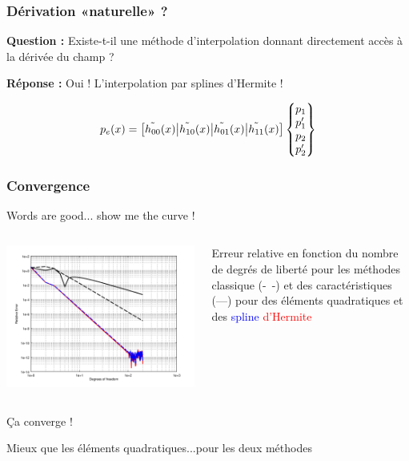 \documentclass[10pt, compress]{beamer}
\begin{document}
\begin{frame}
	\frametitle{Dérivation «naturelle» ?}

	\textbf{Question :} Existe-t-il une méthode d'interpolation donnant \alert{directement accès} à la dérivée du champ
	?

	\pause
	\bigskip

	\textbf{Réponse :} Oui ! L'interpolation par \alert{splines d'Hermite} !

	\begin{equation*}
		p_e(x) = \left[\tilde{h_{00}}(x)\big|\tilde{h_{10}}(x)\big|\tilde{h_{01}}(x)\big|\tilde{h_{11}}(x)\right]\begin{Bmatrix}p_1\\p'_1\\p_2\\p'_2\end{Bmatrix}
	\end{equation*}
\end{frame}

\begin{frame}
	\frametitle{Convergence}
	\begin{block}{Words are good... show me the curve !}
		\begin{columns}[onlytextwidth]
		\begin{column}{0.6\textwidth}
			\includegraphics[width=\textwidth]{../report/part4/figs/herm_comp.png}
		\end{column}
		\begin{column}{0.4\textwidth}
            \footnotesize{Erreur relative en fonction du nombre de degrés de liberté pour les méthodes classique
            (-~-) et des caractéristiques (---) pour des éléments quadratiques et des \textcolor{blue}{spline}
            \textcolor{red}{d'Hermite}}
		\end{column}
		\end{columns}
	\end{block}

    \pause

    \begin{center}
        \alert{Ça converge !}

        \pause

        Mieux que les éléments quadratiques...\pause pour les deux méthodes
    \end{center}
\end{frame}
\end{document}
